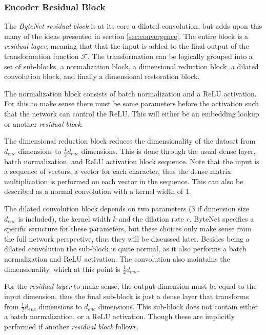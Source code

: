 \subsubsection{Encoder Residual Block}

The \textit{ByteNet residual block} is at its core a dilated convolution, but adds upon this many of the ideas presented in section \ref{sec:convergence}. The entire block is a \textit{residual layer}, meaning that that the input is added to the final output of the transformation function $\mathcal{F}$. The transformation can be logically grouped into a set of sub-blocks, a normalization block, a dimensional reduction block, a dilated convolution block, and finally a dimensional restoration block.

The normalization block consists of batch normalization and a ReLU activation. For this to make sense there must be some parameters before the activation such that the network can control the ReLU. This will either be an embedding lookup or another \textit{residual block}.

The dimensional reduction block reduces the dimensionality of the dataset from $d_{enc}$ dimensions to $\frac{1}{2}d_{enc}$ dimensions. This is done through the usual dense layer, batch normalization, and ReLU activation block sequence. Note that the input is a sequence of vectors, a vector for each character, thus the dense matrix multiplication is performed on each vector in the sequence. This can also be described as a normal convolution with a kernel width of 1.

\afterpage{\clearpage}

The dilated convolution block depends on two parameters (3 if dimension size $d_{enc}$ is included), the kernel width $k$ and the dilation rate $r$. ByteNet specifies a specific structure for these parameters, but these choices only make sense from the full network perspective, thus they will be discussed later. Besides being a dilated convolution the sub-block is quite normal, as it also performs a batch normalization and ReLU activation. The convolution also maintains the dimensionality, which at this point is $\frac{1}{2}d_{enc}$.

For the \textit{residual layer} to make sense, the output dimension must be equal to the input dimension, thus the final sub-block is just a dense layer that transforms from $\frac{1}{2}d_{enc}$ dimensions to $d_{enc}$ dimensions. This sub-block does not contain either a batch normalization, or a ReLU activation. Though these are implicitly performed if another \textit{residual block} follows.

